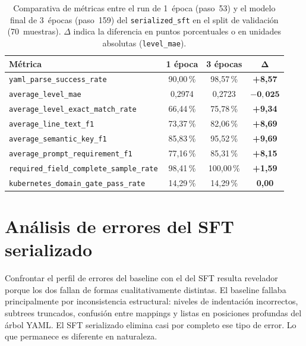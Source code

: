 \begin{table}[htbp]
\centering
\caption{Comparativa de métricas entre el run de 1~época (paso~53) y el modelo final
         de 3~épocas (paso~159) del \texttt{serialized\_sft} en el split de validación
         (70~muestras). $\Delta$ indica la diferencia en puntos porcentuales o en unidades
         absolutas (\texttt{level\_mae}).}
\label{tab:ch5_epoch_ablation}
\begin{tabular}{lccc}
\toprule
\textbf{Métrica} & \textbf{1 época} & \textbf{3 épocas} & $\boldsymbol{\Delta}$ \\
\midrule
\texttt{yaml\_parse\_success\_rate}
    & 90{,}00\,\% & 98{,}57\,\% & \textbf{+8{,}57} \\
\texttt{average\_level\_mae}
    & 0{,}2974 & 0{,}2723 & $\mathbf{-0{,}025}$ \\
\texttt{average\_level\_exact\_match\_rate}
    & 66{,}44\,\% & 75{,}78\,\% & \textbf{+9{,}34} \\
\texttt{average\_line\_text\_f1}
    & 73{,}37\,\% & 82{,}06\,\% & \textbf{+8{,}69} \\
\texttt{average\_semantic\_key\_f1}
    & 85{,}83\,\% & 95{,}52\,\% & \textbf{+9{,}69} \\
\texttt{average\_prompt\_requirement\_f1}
    & 77{,}16\,\% & 85{,}31\,\% & \textbf{+8{,}15} \\
\texttt{required\_field\_complete\_sample\_rate}
    & 98{,}41\,\% & 100{,}00\,\% & \textbf{+1{,}59} \\
\texttt{kubernetes\_domain\_gate\_pass\_rate}
    & 14{,}29\,\% & 14{,}29\,\% & \textbf{0{,}00} \\
\bottomrule
\end{tabular}
\end{table}


\section{Análisis de errores del SFT serializado}
\label{sec:ch5_sft_errors}

Confrontar el perfil de errores del baseline con el del SFT resulta revelador porque los dos
fallan de formas cualitativamente distintas. El baseline fallaba principalmente por
inconsistencia estructural: niveles de indentación incorrectos, subtrees truncados, confusión
entre mappings y listas en posiciones profundas del árbol YAML. El SFT serializado elimina
casi por completo ese tipo de error. Lo que permanece es diferente en naturaleza.

